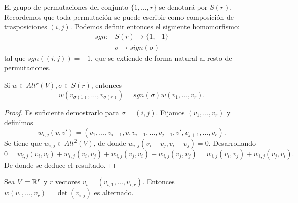 \documentclass[CV.tex]{subfiles}
\begin{document}
El grupo de permutaciones del conjunto $\{1,\dots, r\}$ se denotará por $S(r)$. Recordemos que toda permutación se puede escribir como composición de trasposiciones $(i,j)$. Podemos definir entonces el siguiente homomorfismo:
\begin{align*}
sgn: & S(r)\to \{1,-1\}\\
& \sigma\to sign(\sigma)
\end{align*}
tal que $sgn((i,j))=-1$, que se extiende de forma natural al resto de permutaciones.
\begin{lemma}\label{signo}
Si $w\in Alt^r(V), \sigma\in S(r)$, entonces
$$w(v_{\sigma(1)},\dots, v_{\sigma(r)})=sgn(\sigma)w(v_1,\dots, v_r).$$
\end{lemma}
\begin{proof}
Es suficiente demostrarlo para $\sigma=(i,j)$. Fijamos $(v_1,\dots, v_r)$ y definimos 
$$w_{i,j}(v,v')=(v_1,\dots,v_{i-1},v,v_{i+1},\dots, v_{j-1},v',v_{j+1},\dots, v_r).$$ 
Se tiene que $w_{i,j}\in Alt^2(V)$, de donde $w_{i,j}(v_i+v_j,v_i+v_j)=0$. Desarrollando
$$
0=w_{i,j}(v_i,v_i)+w_{i,j}(v_i,v_j)+w_{i,j}(v_j,v_i)+w_{i,j}(v_j,v_j)=w_{i,j}(v_i,v_j)+w_{i,j}(v_j,v_i).$$
De donde se deduce el resultado.
\end{proof}
\begin{ej}
Sea $V=\mathbb{R}^r$ y $r$ vectores $v_i=(v_{i,1},\dots, v_{i,r})$. Entonces $w(v_1,\dots, v_r)=\det(v_{i,j})$ es alternado. 
\end{ej}
\end{document}
